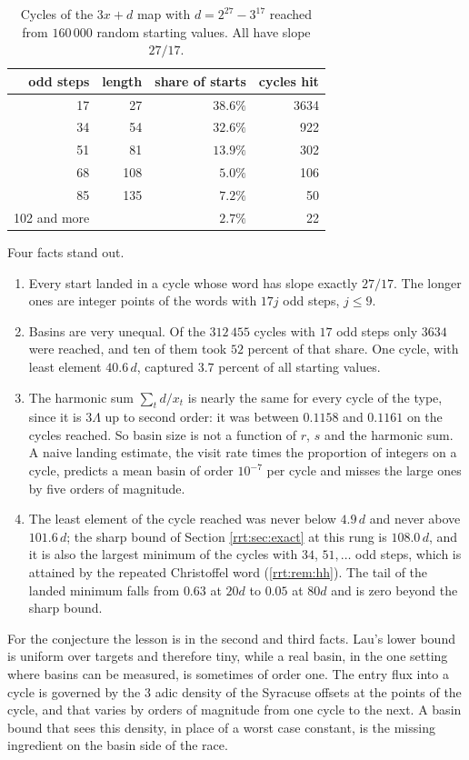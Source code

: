 \begin{table}[t]
\centering
\small
\begin{tabular}{rrrr}
\toprule
odd steps & length & share of starts & cycles hit\\
\midrule
17 & 27 & $38.6\%$ & 3634\\
34 & 54 & $32.6\%$ & 922\\
51 & 81 & $13.9\%$ & 302\\
68 & 108 & $5.0\%$ & 106\\
85 & 135 & $7.2\%$ & 50\\
102 and more & & $2.7\%$ & 22\\
\bottomrule
\end{tabular}
\caption{Cycles of the $3x+d$ map with $d=2^{27}-3^{17}$ reached from $160\,000$ random starting values. All have slope $27/17$.}
\label{rrt:tab:basin}
\end{table}

Four facts stand out.
\begin{enumerate}
\item Every start landed in a cycle whose word has slope exactly $27/17$. The longer ones are integer points of the words with $17j$ odd steps, $j\le 9$.
\item Basins are very unequal. Of the $312\,455$ cycles with $17$ odd steps only $3634$ were reached, and ten of them took $52$ percent of that share. One cycle, with least element $40.6\,d$, captured $3.7$ percent of all starting values.
\item The harmonic sum $\sum_t d/x_t$ is nearly the same for every cycle of the type, since it is $3\Lambda$ up to second order: it was between $0.1158$ and $0.1161$ on the cycles reached. So basin size is not a function of $r$, $s$ and the harmonic sum. A naive landing estimate, the visit rate times the proportion of integers on a cycle, predicts a mean basin of order $10^{-7}$ per cycle and misses the large ones by five orders of magnitude.
\item The least element of the cycle reached was never below $4.9\,d$ and never above $101.6\,d$; the sharp bound of Section \ref{rrt:sec:exact} at this rung is $108.0\,d$, and it is also the largest minimum of the cycles with $34$, $51,\dots$ odd steps, which is attained by the repeated Christoffel word (\cref{rrt:rem:hh}). The tail of the landed minimum falls from $0.63$ at $20d$ to $0.05$ at $80d$ and is zero beyond the sharp bound.
\end{enumerate}

For the conjecture the lesson is in the second and third facts. Lau's lower bound is uniform over targets and therefore tiny, while a real basin, in the one setting where basins can be measured, is sometimes of order one. The entry flux into a cycle is governed by the $3$ adic density of the Syracuse offsets at the points of the cycle, and that varies by orders of magnitude from one cycle to the next. A basin bound that sees this density, in place of a worst case constant, is the missing ingredient on the basin side of the race.


